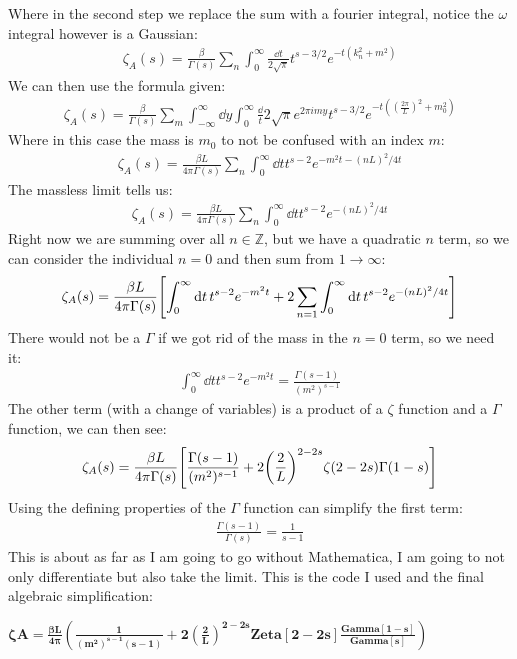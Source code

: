 \documentclass[12pt]{article}
\begin{document}
Where in the second step we replace the sum with a fourier integral, notice the $\omega$ integral however is a Gaussian:
\begin{align*}
  \zeta_A(s)=\frac{\beta}{\Gamma(s)}\sum_{n}\int_0^\infty
  \frac{\dd{t}}{2\sqrt\pi}t^{s-3/2}e^{-t(k_n^2+m^2)}
\end{align*}
We can then use the formula given:
\begin{align*}
  \zeta_A(s)=\frac{\beta}{\Gamma(s)}\sum_m\int_{-\infty}^\infty\dd{y}
  \int_0^\infty\frac\dd{t}{2\sqrt\pi}e^{2\pi imy}t^{s-3/2}
  e^{-t((\frac{2\pi}{L})^2+m_0^2)}
\end{align*}
Where in this case the mass is $m_0$ to not be confused with an index $m$:
\begin{align*}
  \zeta_A(s)=\frac{\beta L}{4\pi\Gamma(s)}\sum_n  \int_0^\infty
  \dd{t}t^{s-2} e^{-m^2t-(nL)^2/4t}
\end{align*}
The massless limit tells us:
\begin{align*}
  \zeta_A(s)=\frac{\beta L}{4\pi\Gamma(s)}\sum_n  \int_0^\infty
  \dd{t}t^{s-2} e^{-(nL)^2/4t}
\end{align*}
Right now we are summing over all $n\in\mathbb{Z}$, but we have a quadratic $n$ term, so we can consider the individual $n=0$ and then sum from $1\to\infty$:
\begin{align*}
  \zeta_A(s)=\frac{\beta L}{4\pi\Gamma(s)}
  \qty[\int_0^\infty\dd{t}t^{s-2}e^{-m^2t}+2\sum_{n=1}  \int_0^\infty
  \dd{t}t^{s-2} e^{-(nL)^2/4t}]
\end{align*}
There would not be a $\Gamma$ if we got rid of the mass in the $n=0$ term, so we need it:
\begin{align*}
  \int_0^\infty\dd{t}t^{s-2}e^{-m^2t}=\frac{\Gamma(s-1)}{(m^2)^{s-1}}
\end{align*}
The other term (with a change of variables) is a product of a $\zeta$ function and a $\Gamma$ function, we can then see:
\begin{align*}
  \zeta_A(s)=\frac{\beta L}{4\pi\Gamma(s)}
  \qty[\frac{\Gamma(s-1)}{(m^2)^{s-1}}+2\qty(\frac2L)^{2-2s}
  \zeta(2-2s)\Gamma(1-s)]
\end{align*}
Using the defining properties of the $\Gamma$ function can simplify the first term:
\begin{align*}
  \frac{\Gamma(s-1)}{\Gamma(s)}=\frac1{s-1}
\end{align*}
This is about as far as I am going to go without Mathematica, I am going to not only differentiate but also take the limit. This is the code I used and the final algebraic simplification:
\begin{doublespace}
\noindent\(\pmb{\text{$\zeta $A}=\frac{\beta  L}{4\pi }\left(\frac{1}{\left(m^2\right)^{s-1}(s-1)}+2\left(\frac{2}{L}\right)^{2-2s}\text{Zeta}[2-2s]\frac{\text{Gamma}[1-s]}{\text{Gamma}[s]}\right)}\)
\end{doublespace}
\end{document}
